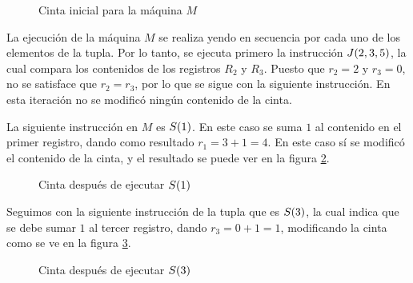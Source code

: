 \begin{figure}[h!]
	\centering


	\label{fig:cinta_inicial}
	\caption{Cinta inicial para la máquina $M$}
\end{figure}

La ejecución de la máquina $M$ se realiza yendo en secuencia por cada uno de los elementos de la tupla. Por lo tanto, se ejecuta primero la instrucción $J\pa*{2, 3, 5}$, la cual compara los contenidos de los registros $R_{2}$ y $R_{3}$. Puesto que $r_{2} = 2$ y $r_{3} = 0$, no se satisface que $r_{2} = r_{3}$, por lo que se sigue con la siguiente instrucción. En esta iteración no se modificó ningún contenido de la cinta.

La siguiente instrucción en $M$ es $S\pa*{1}$. En este caso se suma $1$ al contenido en el primer registro, dando como resultado $r_{1} = 3 + 1 = 4$. En este caso sí se modificó el contenido de la cinta, y el resultado se puede ver en la figura \ref{fig:cinta_despues_de_s1}.

\begin{figure}[h!]
	\centering


	\caption{Cinta después de ejecutar $S\pa*{1}$}
	\label{fig:cinta_despues_de_s1}
\end{figure}

Seguimos con la siguiente instrucción de la tupla que es $S\pa*{3}$, la cual indica que se debe sumar $1$ al tercer registro, dando $r_{3} = 0 + 1 = 1$, modificando la cinta como se ve en la figura \ref{fig:cinta_despues_de_s3}.

\begin{figure}[h!]
	\centering


	\caption{Cinta después de ejecutar $S\pa*{3}$}
	\label{fig:cinta_despues_de_s3}
\end{figure}

